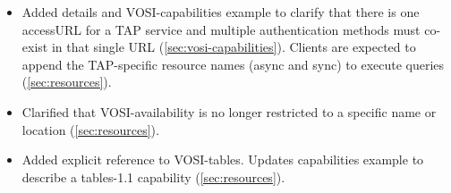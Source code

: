 \documentclass[11pt,letter]{ivoa}
\begin{document}
\begin{itemize}
\item Added details and VOSI-capabilities example to clarify that there is one accessURL for a TAP service and
multiple authentication methods must co-exist in that single URL (\ref{sec:vosi-capabilities}). Clients are
expected to append the TAP-specific resource names (async and sync) to execute queries (\ref{sec:resources}).

\item Clarified that VOSI-availability is no longer restricted to a
specific name or location (\ref{sec:resources}).

\item Added explicit reference to VOSI-tables. Updates capabilities example to describe a
tables-1.1 capability (\ref{sec:resources}).
\end{itemize}
\end{document}
